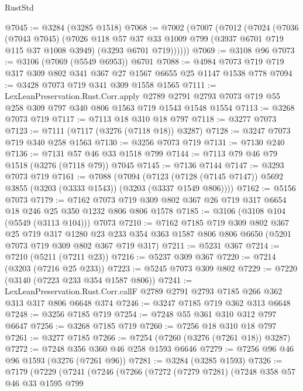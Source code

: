 \begin{lexlean}{RustStd}
\begin{coremodule}
{\begin{coremodule}
{{{{{{{{{{{{{{{@7045 := @3284 (@3285 @1518)
@7068 := @7002
    (@7007
      (@7012
        (@7024
          (@7036
            (@7043 @7045)
            (@7026
              @118
              @57
              @37
              @33
              @1009
              @799
              (@3937 @6701 @719 @115 @37 @1008 @3949)
              (@3293 @6701 @719))))))
@7069 := @3108 @96
@7073 := @3106 (@7069 (@5549 @6953)) @6701
@7088 := @4984 @7073 @719 @719 @317 @309 @802 @341 @367 @27 @1567 @6655 @25 @1147 @1538 @778
@7094 := @3428 @7073 @719 @341 @309 @1558 @1565
@7111 := LexLeanPreservation.Rust.Corr.apply
    @2789
    @2791
    @2793
    @7073
    @719
    @55
    @258
    @309
    @797
    @340
    @806
    @1563
    @719
    @1543
    @1548
    @1554
@7113 := @3268 @7073 @719
@7117 := @7113 @18 @310 @18 @797
@7118 := @3277 @7073
@7123 := @7111 (@7117 (@3276 (@7118 @18)) @3287)
@7128 := @3247 @7073 @719 @340 @258 @1563
@7130 := @3256 @7073 @719
@7131 := @7130 @240
@7136 := @7131 @57 @46 @33 @1518 @799
@7144 := @7113 @79 @46 @79 @1518 (@3276 (@7118 @79)) @7045
@7145 := @7136 @7144
@7147 := @3293 @7073 @719
@7161 := @7088
    (@7094
      (@7123 (@7128 (@7145 @7147)) @5692 @3855 (@3203 (@3333 @1543)) (@3203 (@3337 @1549 @806))))
@7162 := @5156 @7073
@7179 := @7162 @7073 @719 @309 @802 @367 @26 @719 @317 @6654 @18 @246 @25 @350 @1232 @806 @806 @1578
@7185 := @3106 (@3108 @104 (@5549 (@3113 @104))) @7073
@7210 := @7162
    @7185
    @719
    @309
    @802
    @367
    @25
    @719
    @317
    @1280
    @23
    @233
    @354
    @363
    @1587
    @806
    @806
    @6650
    (@5201 @7073 @719 @309 @802 @367 @719 @317)
@7211 := @5231 @367
@7214 := @7210 (@5211 (@7211 @23))
@7216 := @5237 @309 @367
@7220 := @7214 (@3203 (@7216 @25 @233))
@7223 := @5245 @7073 @309 @802
@7229 := @7220 (@3140 (@7223 @233 @354 @1587 @806))
@7241 := LexLeanPreservation.Rust.Corr.callF
    @2789
    @2791
    @2793
    @7185
    @266
    @362
    @313
    @317
    @806
    @6648
    @374
@7246 := @3247 @7185 @719 @362 @313 @6648
@7248 := @3256 @7185 @719
@7254 := @7248 @55 @361 @310 @312 @797 @6647
@7256 := @3268 @7185 @719
@7260 := @7256 @18 @310 @18 @797
@7261 := @3277 @7185
@7266 := @7254 (@7260 (@3276 (@7261 @18)) @3287)
@7272 := @7248 @356 @360 @46 @258 @1593 @6646
@7279 := @7256 @96 @46 @96 @1593 (@3276 (@7261 @96))
@7281 := @3284 (@3285 @1593)
@7326 := @7179
    (@7229
      (@7241
        (@7246
          (@7266
            (@7272
              (@7279 @7281)
              (@7248
                @358
                @57
                @46
                @33
                @1595
                @799
}}}}}}}}}}}}}}}
\end{coremodule}}
\end{coremodule}
\end{lexlean}
